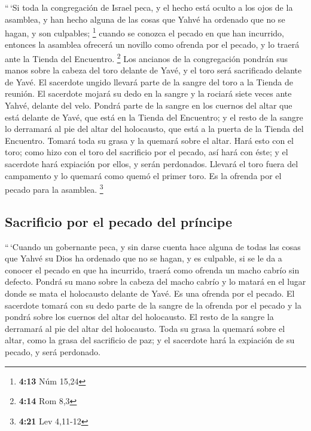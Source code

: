  ``\,`Si toda la congregación de Israel peca, y el hecho
está oculto a los ojos de la asamblea, y han hecho alguna de las cosas
que Yahvé ha ordenado que no se hagan, y son culpables; \footnote{\textbf{4:13}
  Núm 15,24}  cuando se conozca el pecado en que han
incurrido, entonces la asamblea ofrecerá un novillo como ofrenda por el
pecado, y lo traerá ante la Tienda del Encuentro. \footnote{\textbf{4:14}
  Rom 8,3}  Los ancianos de la congregación pondrán sus
manos sobre la cabeza del toro delante de Yavé, y el toro será
sacrificado delante de Yavé.  El sacerdote ungido llevará
parte de la sangre del toro a la Tienda de reunión.  El
sacerdote mojará su dedo en la sangre y la rociará siete veces ante
Yahvé, delante del velo.  Pondrá parte de la sangre en
los cuernos del altar que está delante de Yavé, que está en la Tienda
del Encuentro; y el resto de la sangre lo derramará al pie del altar del
holocausto, que está a la puerta de la Tienda del Encuentro.
 Tomará toda su grasa y la quemará sobre el altar.
 Hará esto con el toro; como hizo con el toro del
sacrificio por el pecado, así hará con éste; y el sacerdote hará
expiación por ellos, y serán perdonados.  Llevará el toro
fuera del campamento y lo quemará como quemó el primer toro. Es la
ofrenda por el pecado para la asamblea. \footnote{\textbf{4:21} Lev
  4,11-12}

\hypertarget{sacrificio-por-el-pecado-del-pruxedncipe}{%
\subsection{Sacrificio por el pecado del
príncipe}\label{sacrificio-por-el-pecado-del-pruxedncipe}}

 ``\,`Cuando un gobernante peca, y sin darse cuenta hace
alguna de todas las cosas que Yahvé su Dios ha ordenado que no se hagan,
y es culpable,  si se le da a conocer el pecado en que ha
incurrido, traerá como ofrenda un macho cabrío sin defecto.
 Pondrá su mano sobre la cabeza del macho cabrío y lo
matará en el lugar donde se mata el holocausto delante de Yavé. Es una
ofrenda por el pecado.  El sacerdote tomará con su dedo
parte de la sangre de la ofrenda por el pecado y la pondrá sobre los
cuernos del altar del holocausto. El resto de la sangre la derramará al
pie del altar del holocausto.  Toda su grasa la quemará
sobre el altar, como la grasa del sacrificio de paz; y el sacerdote hará
la expiación de su pecado, y será perdonado.

